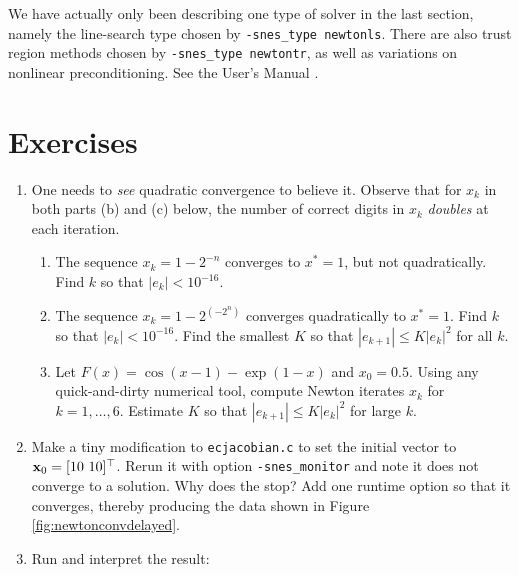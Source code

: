 We have actually only been describing one type of \pSNES solver in the last section, namely the line-search \pSNES type chosen by \texttt{-snes\_type newtonls}.  There are also trust region methods \citep{NocedalWright2006} chosen by \texttt{-snes\_type newtontr}, as well as variations on nonlinear preconditioning.  See the \PETSc User's Manual \citep{petsc-user-ref}.


\section{Exercises}

\renewcommand{\labelenumi}{\arabic{chapter}.\arabic{enumi}\quad}
\renewcommand{\labelenumii}{(\alph{enumii})}
\begin{enumerate}
\item One needs to \emph{see} quadratic convergence to believe it.  Observe that for $x_k$ in both parts (b) and (c) below, the number of correct digits in $x_k$ \emph{doubles} at each iteration.
    \begin{enumerate}
    \item The sequence $x_k = 1-2^{-n}$ converges to $x^*=1$, but not quadratically.  Find $k$ so that $|e_k| < 10^{-16}$.
    \item The sequence $x_k = 1-2^{(-2^n)}$ converges quadratically to $x^*=1$.  Find $k$ so that $|e_k| < 10^{-16}$.  Find the smallest $K$ so that $|e_{k+1}| \le K |e_k|^2$ for all $k$.
    \item Let $F(x) = \cos(x-1) - \exp(1-x)$ and $x_0=0.5$.  Using any quick-and-dirty numerical tool, compute Newton iterates $x_k$ for $k=1,\dots,6$.  Estimate $K$ so that $|e_{k+1}| \le K |e_k|^2$ for large $k$.
    \end{enumerate}

\item Make a tiny modification to \texttt{ecjacobian.c} to set the initial vector to $\mathbf{x}_0 = [10\,\, 10]^\top$.  Rerun it with option \texttt{-snes\_monitor} and note it does not converge to a solution.  Why does the \pSNES stop?  Add one runtime option so that it converges, thereby producing the data shown in Figure \ref{fig:newtonconvdelayed}.

\item \label{exer:nl:snestestdisplay}  Run and interpret the result:


\end{enumerate}
